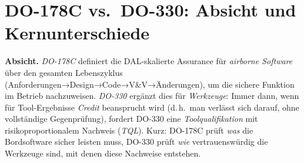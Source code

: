 \section{DO-178C vs.\ DO-330: Absicht und Kernunterschiede}
\textbf{Absicht.} \emph{DO-178C} \parencite{do-178c} definiert die
DAL-skalierte Assurance für \emph{airborne Software} über den gesamten Lebenszyklus (Anforderungen→Design→Code→V\&V→Änderungen),
um die sichere Funktion im Betrieb nachzuweisen. \emph{DO-330} \parencite{do-330} ergänzt dies für \emph{Werkzeuge}:
Immer dann, wenn für Tool-Ergebnisse \emph{Credit} beansprucht wird (d.\,h.\ man verlässt sich darauf, ohne vollständige Gegenprüfung),
fordert DO-330 eine \emph{Toolqualifikation} mit risikoproportionalem Nachweis (\emph{TQL}). Kurz: DO-178C prüft \emph{was} die
Bordsoftware sicher leisten muss, DO-330 prüft \emph{wie} vertrauenswürdig die Werkzeuge sind, mit denen diese Nachweise entstehen.

